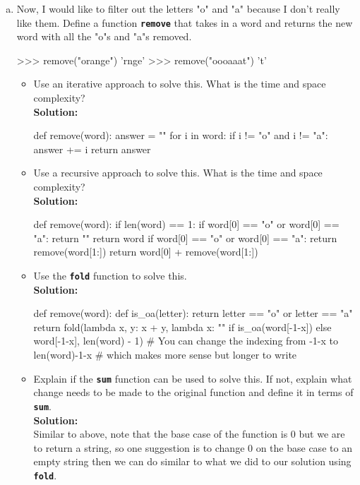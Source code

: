 \begin{enumerate}[(a)]
\item Now, I would like to filter out the letters "o" and "a" because I don't really like them. Define a
function \texttt{\bfseries remove} that takes in a word and returns the new word with all the "o"s and "a"s
removed.
\begin{python}
>>> remove("orange")
'rnge'
>>> remove("oooaaat")
't'
\end{python}
\begin{itemize}
\item Use an iterative approach to solve this. What is the time and space complexity? \\
\textbf{Solution:}
\begin{python}
def remove(word):
    answer = ""
    for i in word:
        if i != "o" and i != "a":
            answer += i
    return answer
\end{python}
\item Use a recursive approach to solve this. What is the time and space complexity? \\
\textbf{Solution:}
\begin{python}
def remove(word):
    if len(word) == 1:
        if word[0] == "o" or word[0] == "a":
            return ""
        return word
    if word[0] == "o" or word[0] == "a":
        return remove(word[1:])
    return word[0] + remove(word[1:])
\end{python}
\item Use the \texttt{\bfseries fold} function to solve this. \\
\textbf{Solution:}
\begin{python}
def remove(word):
    def is_oa(letter):
        return letter == "o" or letter == "a"
    return fold(lambda x, y: x + y,
                lambda x: "" if is_oa(word[-1-x]) else word[-1-x],
                len(word) - 1)
    # You can change the indexing from -1-x to len(word)-1-x
    # which makes more sense but longer to write
\end{python}
\item Explain if the \texttt{\bfseries sum} function can be used to solve this. If not, explain what change needs
to be made to the original function and define it in terms of \texttt{\bfseries sum}. \\
\textbf{Solution:} \\
Similar to above, note that the base case of the function is 0 but we are to return a string, so one suggestion is to change 0 on the 
base case to an empty string then we can do similar to what we did to our solution using \texttt{\bfseries fold}.

\end{itemize}
\end{enumerate}

